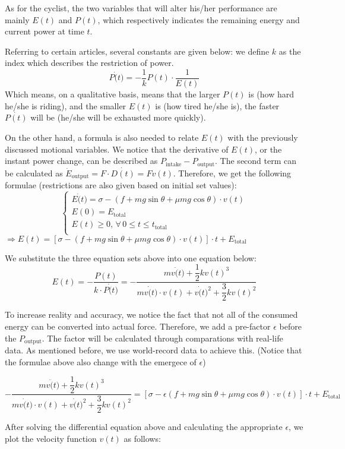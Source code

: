 \documentclass[14pt]{article}
\theoremstyle{definition}
\theoremstyle{remark}
\numberwithin{equation}{section}
\begin{document}
\begin{itemize}
			As for the cyclist, the two variables that will alter his/her performance are mainly \(E(t)\) and \(P(t)\), which respectively indicates the remaining energy and current power at time \(t\).

			Referring to certain articles\cite{114514}, several constants are given below: we define $k$ as the index which describes the restriction of power.
			\[P \dot(t)=-\dfrac{1}{ k } P (t) \cdot \dfrac{1}{ E (t)}\]
			Which means, on a qualitative basis, means that the larger \(P(t)\) is (how hard he/she is riding), and the smaller \(E(t)\) is (how tired he/she is), the faster \(\dot{P(t)}\) will be (he/she will be exhausted more quickly).

			On the other hand, a formula is also needed to relate \(E(t)\) with the previously discussed motional variables. We notice that the derivative of \(E(t)\), or the instant power change, can be described as \(P_{\mathrm{intake}} - P_{\mathrm{output}}\). The second term can be calculated as \(\dot{E}_{\mathrm{output}}=F\cdot \dot{D\left( t \right)} =Fv\left( t \right) \). Therefore, we get the following formulae (restrictions are also given based on initial set values):
			$$
			\begin{cases}
				\displaystyle
				E \dot(t)=\sigma-\left(f+mg\sin\theta+\mu mg\cos \theta\right)\cdot v(t) \\
				E (0)= E _\mathrm{total} \\
				E (t)\geq0,\, \forall\,0 \leq t \leq t_\mathrm{total} \\
			\end{cases}
			$$
			\(\Rightarrow E (t)=\left[\sigma-\left(f+mg\sin \theta +\mu mg \cos \theta \right)\cdot v(t)\right]\cdot t+ E _\mathrm{total}\)

			We substitute the three equation sets above into one equation below:
			\[E (t)=-\dfrac{P (t)}{ k \cdot P \dot(t)}=-\dfrac{mv\ddot(t)+\dfrac{1}{2} k {v(t)}^3}{mv\dot(t)\cdot v(t)+v\dot(t)^2+\dfrac{3}{2} k {v(t)}^2}\]

			To increase reality and accuracy, we notice the fact that not all of the consumed energy can be converted into actual force. Therefore, we add a pre-factor \(\epsilon\) before the \(P_{\mathrm{output}}\). The factor will be calculated through comparations with real-life data. As mentioned before, we use world-record data to achieve this. (Notice that the formulae above also change with the emergece of \(\epsilon\))
			\begin{footnotesize}
				 $$ -\dfrac{mv\ddot(t)+\dfrac{1}{2} k {v(t)}^3}{mv\dot(t)\cdot v(t)+v\dot(t)^2+\dfrac{3}{2} k {v(t)}^2} =  \left[\sigma-\epsilon\left(f+mg\sin \theta +\mu mg \cos \theta \right)\cdot v(t)\right]\cdot t+ E _\mathrm{total}$$
			\end{footnotesize}
			After solving the differential equation above and calculating the appropriate \(\epsilon\), we plot the velocity function \(v\left(t\right)\) as follows:


\end{itemize}
\end{document}
